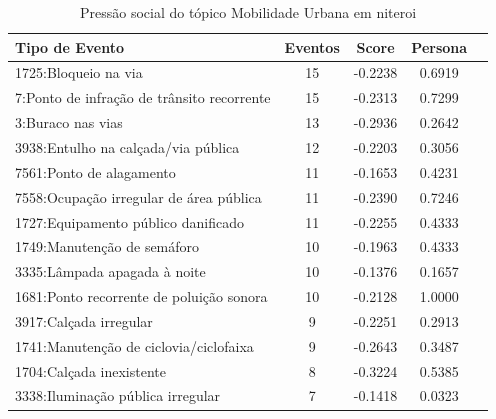 \begin{table}[htbp]
	\centering
	\caption{Pressão social do tópico Mobilidade Urbana em niteroi}
	\label{tab:eventos_populares_mobility_niteroi}
	\begin{tabular}{|l|c|c|c|c|}
		\hline
		\textbf{Tipo de Evento}                             & \textbf{Eventos} & \textbf{Score} & \textbf{Persona} \\
		\hline
		1725:Bloqueio na via                                & 15               & -0.2238        & 0.6919           \\
		\hline
		7:Ponto de infração de trânsito recorrente          & 15               & -0.2313        & 0.7299           \\
		\hline
		3:Buraco nas vias                                   & 13               & -0.2936        & 0.2642           \\
		\hline
		3938:Entulho na calçada/via pública                 & 12               & -0.2203        & 0.3056           \\
		\hline
		7561:Ponto de alagamento                            & 11               & -0.1653        & 0.4231           \\
		\hline
		7558:Ocupação irregular de área pública             & 11               & -0.2390        & 0.7246           \\
		\hline
		1727:Equipamento público danificado                 & 11               & -0.2255        & 0.4333           \\
		\hline
		1749:Manutenção de semáforo                         & 10               & -0.1963        & 0.4333           \\
		\hline
		3335:Lâmpada apagada à noite                        & 10               & -0.1376        & 0.1657           \\
		\hline
		1681:Ponto recorrente de poluição sonora            & 10               & -0.2128        & 1.0000           \\
		\hline
		3917:Calçada irregular                              & 9                & -0.2251        & 0.2913           \\
		\hline
		1741:Manutenção de ciclovia/ciclofaixa              & 9                & -0.2643        & 0.3487           \\
		\hline
		1704:Calçada inexistente                            & 8                & -0.3224        & 0.5385           \\
		\hline
		3338:Iluminação pública irregular                   & 7                & -0.1418        & 0.0323           \\

\end{tabular}
\end{table}

